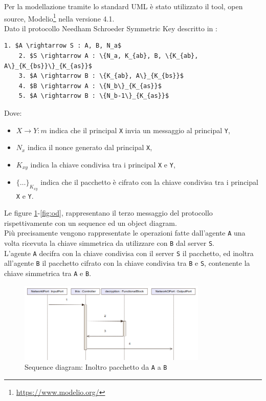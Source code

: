Per la modellazione tramite lo standard UML è stato utilizzato il tool, open source, Modelio\footnote{\url{https://www.modelio.org/}} nella versione 4.1.\\
Dato il protocollo Needham Schroeder Symmetric Key descritto in \cite{NS78}:
\begin{lstlisting}[mathescape]
    1. $A \rightarrow S : A, B, N_a$
    2. $S \rightarrow A : \{N_a, K_{ab}, B, \{K_{ab}, A\}_{K_{bs}}\}_{K_{as}}$
    3. $A \rightarrow B : \{K_{ab}, A\}_{K_{bs}}$
    4. $B \rightarrow A : \{N_b\}_{K_{as}}$
    5. $A \rightarrow B : \{N_b-1\}_{K_{as}}$
\end{lstlisting}
\noindent Dove:
\begin{itemize}
    \item $X \rightarrow Y : m$ indica che il principal \texttt{X} invia un messaggio al principal \texttt{Y},
    \item $N_x$ indica il nonce generato dal principal \texttt{X},
    \item $K_{xy}$ indica la chiave condivisa tra i principal \texttt{X} e \texttt{Y},
    \item $\{\dots\}_{K_{xy}}$ indica che il pacchetto è cifrato con la chiave condivisa tra i principal \texttt{X} e \texttt{Y}.
\end{itemize}
Le figure \ref{fig:sd}-\ref{fig:od}, rappresentano il terzo messaggio del protocollo rispettivamente con un sequence ed un object diagram.\\
Più precisamente vengono rappresentate le operazioni fatte dall'agente \texttt{A} una volta ricevuta la chiave simmetrica da utilizzare con \texttt{B} dal server \texttt{S}.\\
L'agente \texttt{A} decifra con la chiave condivisa con il server \texttt{S} il pacchetto, ed inoltra all'agente \texttt{B} il pacchetto cifrato con la chiave condivisa tra \texttt{B} e \texttt{S}, contenente la chiave simmetrica tra \texttt{A} e \texttt{B}.\\

\begin{figure}[h!] 
    \centering 
        \includegraphics[width=0.8\textwidth]{../img/FirstMessage.png} 
        \caption{Sequence diagram: Inoltro pacchetto da \texttt{A} a \texttt{B}} 
        \label{fig:sd}
\end{figure}

